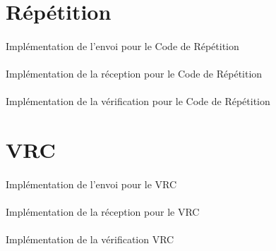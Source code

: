 %
    \section{Répétition}
%
        \paragraph{}
Implémentation de l'envoi pour le Code de Répétition

    \clearpage
%
        \paragraph{}
Implémentation de la réception pour le Code de Répétition

    \clearpage
%
        \paragraph{}
Implémentation de la vérification pour le Code de Répétition

    \clearpage


%
    \section{VRC}
%
        \paragraph{}
Implémentation de l'envoi pour le VRC

    \clearpage
%
        \paragraph{}
Implémentation de la réception pour le VRC

    \clearpage
%
        \paragraph{}
Implémentation de la vérification VRC

    \clearpage
